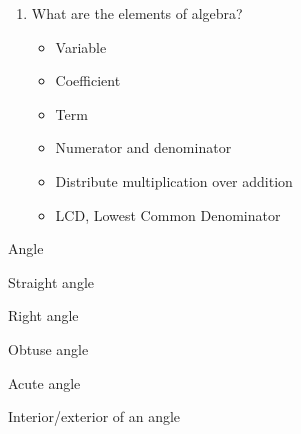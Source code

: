 \begin{enumerate}
\item What are the elements of algebra?
\begin{itemize}
    \item Variable
    \item Coefficient
    \item Term
    \item Numerator and denominator
    \item Distribute multiplication over addition
    \item LCD, Lowest Common Denominator
\end{itemize}
  
\end{enumerate}


\item Angle
\item Straight angle
\item Right angle
\item Obtuse angle
\item Acute angle
\item Interior/exterior of an angle